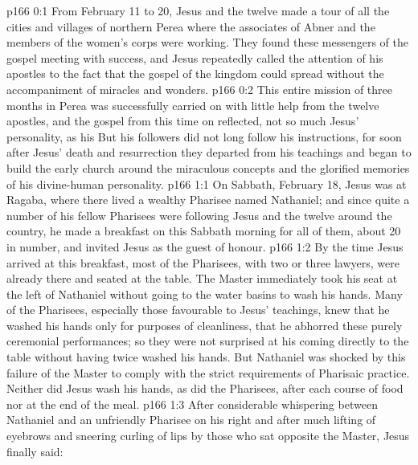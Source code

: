 \author{Midwayer Commission}
\vs p166 0:1 From February 11 to 20, Jesus and the twelve made a tour of all the cities and villages of northern Perea where the associates of Abner and the members of the women’s corps were working. They found these messengers of the gospel meeting with success, and Jesus repeatedly called the attention of his apostles to the fact that the gospel of the kingdom could spread without the accompaniment of miracles and wonders.
\vs p166 0:2 This entire mission of three months in Perea was successfully carried on with little help from the twelve apostles, and the gospel from this time on reflected, not so much Jesus’ personality, as his  But his followers did not long follow his instructions, for soon after Jesus’ death and resurrection they departed from his teachings and began to build the early church around the miraculous concepts and the glorified memories of his divine\hyp{}human personality.
\vs p166 1:1 On Sabbath, February 18, Jesus was at Ragaba, where there lived a wealthy Pharisee named Nathaniel; and since quite a number of his fellow Pharisees were following Jesus and the twelve around the country, he made a breakfast on this Sabbath morning for all of them, about 20 in number, and invited Jesus as the guest of honour.
\vs p166 1:2 By the time Jesus arrived at this breakfast, most of the Pharisees, with two or three lawyers, were already there and seated at the table. The Master immediately took his seat at the left of Nathaniel without going to the water basins to wash his hands. Many of the Pharisees, especially those favourable to Jesus’ teachings, knew that he washed his hands only for purposes of cleanliness, that he abhorred these purely ceremonial performances; so they were not surprised at his coming directly to the table without having twice washed his hands. But Nathaniel was shocked by this failure of the Master to comply with the strict requirements of Pharisaic practice. Neither did Jesus wash his hands, as did the Pharisees, after each course of food nor at the end of the meal.
\vs p166 1:3 After considerable whispering between Nathaniel and an unfriendly Pharisee on his right and after much lifting of eyebrows and sneering curling of lips by those who sat opposite the Master, Jesus finally said: 
